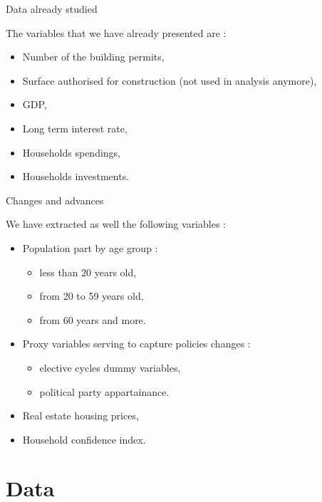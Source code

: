 \documentclass[11pt,ignorenonframetext,]{beamer}
\providecommand{\tightlist}{%
  \setlength{\itemsep}{0pt}\setlength{\parskip}{0pt}}
\begin{document}
\begin{frame}{Data already studied}
\protect\hypertarget{data-already-studied}{}

The variables that we have already presented are :

\begin{itemize}
\tightlist
\item
  Number of the building permits,
\item
  Surface authorised for construction (not used in analysis anymore),
\item
  GDP,
\item
  Long term interest rate,
\item
  Households spendings,
\item
  Households investments.
\end{itemize}

\end{frame}

\begin{frame}{Changes and advances}
\protect\hypertarget{changes-and-advances}{}

We have extracted as well the following variables :

\begin{itemize}
\tightlist
\item
  Population part by age group :

  \begin{itemize}
  \tightlist
  \item
    less than 20 years old,
  \item
    from 20 to 59 years old,
  \item
    from 60 years and more.
  \end{itemize}
\item
  Proxy variables serving to capture policies changes :

  \begin{itemize}
  \tightlist
  \item
    elective cycles dummy variables,
  \item
    political party appartainance.
  \end{itemize}
\item
  Real estate housing prices,
\item
  Household confidence index.
\end{itemize}

\end{frame}

\hypertarget{data}{%
\section{Data}\label{data}}
\end{document}
